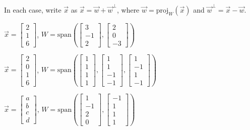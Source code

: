 \documentclass{ximera}
\begin{document}
\begin{problem}
In each case, write $\vec{x}$ as $\vec{x} = \vec{w} + \vec{w}^\perp$, where $\vec{w}=\mbox{proj}_W(\vec{x})$ and $\vec{w}^\perp = \vec{x} - \vec{w}$.

\begin{problem}\label{OrthoDecomp2}
$\vec{x} = \begin{bmatrix}2\\ 1\\ 6\end{bmatrix}$, $W = \mbox{span}\left(\begin{bmatrix}3\\ -1\\ 2\end{bmatrix}, \begin{bmatrix}2\\ 0\\ -3\end{bmatrix}\right)$
\end{problem}

\begin{problem}\label{OrthoDecomp4}
$\vec{x} = \begin{bmatrix}2\\ 0\\ 1\\ 6\end{bmatrix}$, $W = \mbox{span}\left(\begin{bmatrix}1\\ 1\\ 1\\ 1\end{bmatrix}, \begin{bmatrix}1\\ 1\\ -1\\ -1\end{bmatrix}, \begin{bmatrix}1\\ -1\\ 1\\ -1\end{bmatrix}\right)$
\end{problem}

\begin{problem}\label{OrthoDecomp6}
$\vec{x} = \begin{bmatrix}a\\ b\\ c\\ d\end{bmatrix}$, $W = \mbox{span}\left(\begin{bmatrix}1\\ -1\\ 2\\ 0\end{bmatrix}, \begin{bmatrix}-1\\ 1\\ 1\\ 1\end{bmatrix}\right)$
\end{problem}
\end{problem}
	
\end{document}
